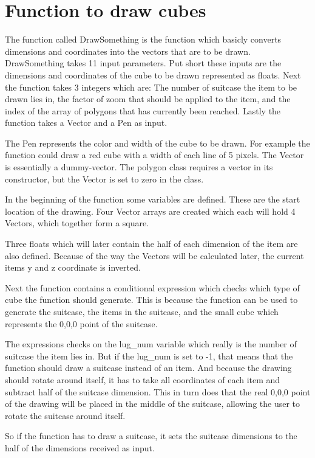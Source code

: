 \section{Function to draw cubes}
The function called DrawSomething is the function which basicly converts dimensions and coordinates into the vectors that are to be drawn.
DrawSomething takes 11 input parameters. Put short these inputs are the dimensions and coordinates of the cube to be drawn represented as floats. Next the function takes 3 integers which are: The number of suitcase the item to be drawn lies in, the factor of zoom that should be applied to the item, and the index of the array of polygons that has currently been reached. Lastly the function takes a Vector and a Pen as input.

The Pen represents the color and width of the cube to be drawn. For example the function could draw a red cube with a width of each line of 5 pixels. The Vector is essentially a dummy-vector. The polygon class requires a vector in its constructor, but the Vector is set to zero in the class.

In the beginning of the function some variables are defined. These are the start location of the drawing. Four Vector arrays are created which each will hold 4 Vectors, which together form a square.

Three floats which will later contain the half of each dimension of the item are also defined.
Because of the way the Vectors will be calculated later, the current items y and z coordinate is inverted. 

Next the function contains a conditional expression which checks which type of cube the function should generate. This is because the function can be used to generate the suitcase, the items in the suitcase, and the small cube which represents the 0,0,0 point of the suitcase. 

The expressions checks on the lug\_num variable which really is the number of suitcase the item lies in. But if the lug\_num is set to -1, that means that the function should draw a suitcase instead of an item. And because the drawing should rotate around itself, it has to take all coordinates of each item and subtract half of the suitcase dimension. This in turn does that the real 0,0,0 point of the drawing will be placed in the middle of the suitcase, allowing the user to rotate the suitcase around itself.

So if the function has to draw a suitcase, it sets the suitcase dimensions to the half of the dimensions received as input.

